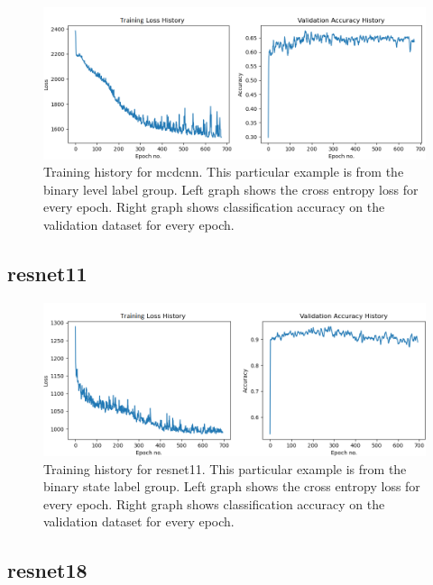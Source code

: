 \begin{figure}[h]
    \centering
    \includegraphics[width=\textwidth]{figures/res_tr_MCDCNN_blevel.png}
    \caption{Training history for \acrlong{mcdcnn}. This particular example is from the binary level label group. Left graph shows the cross entropy loss for every epoch. Right graph shows classification accuracy on the validation dataset for every epoch.}
    \label{fig:res_tr_mcdcnn}
\end{figure}
\FloatBarrier

\subsection{\acrlong{resnet11}}

\begin{figure}[h]
    \centering
    \includegraphics[width=\textwidth]{figures/res_tr_ResNet11_bstate.png}
    \caption{Training history for \acrlong{resnet11}. This particular example is from the binary state label group. Left graph shows the cross entropy loss for every epoch. Right graph shows classification accuracy on the validation dataset for every epoch.}
    \label{fig:res_tr_resnet11}
\end{figure}
\FloatBarrier

\newpage
\subsection{\acrlong{resnet18}}

